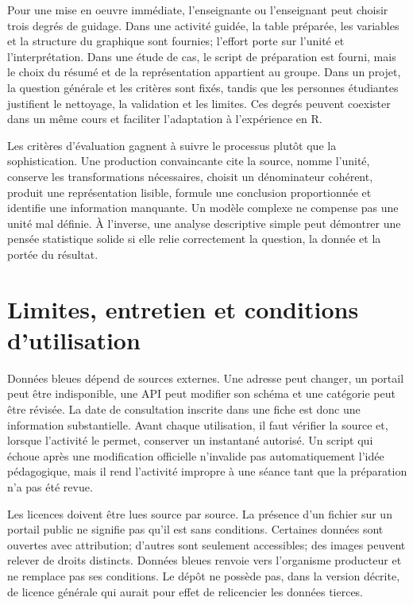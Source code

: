 Pour une mise en oeuvre immédiate, l'enseignante ou l'enseignant peut choisir trois degrés de guidage. Dans une activité guidée, la table préparée, les variables et la structure du graphique sont fournies; l'effort porte sur l'unité et l'interprétation. Dans une étude de cas, le script de préparation est fourni, mais le choix du résumé et de la représentation appartient au groupe. Dans un projet, la question générale et les critères sont fixés, tandis que les personnes étudiantes justifient le nettoyage, la validation et les limites. Ces degrés peuvent coexister dans un même cours et faciliter l'adaptation à l'expérience en R.

Les critères d'évaluation gagnent à suivre le processus plutôt que la sophistication. Une production convaincante cite la source, nomme l'unité, conserve les transformations nécessaires, choisit un dénominateur cohérent, produit une représentation lisible, formule une conclusion proportionnée et identifie une information manquante. Un modèle complexe ne compense pas une unité mal définie. À l'inverse, une analyse descriptive simple peut démontrer une pensée statistique solide si elle relie correctement la question, la donnée et la portée du résultat.

\section{Limites, entretien et conditions d'utilisation}

Données bleues dépend de sources externes. Une adresse peut changer, un portail peut être indisponible, une API peut modifier son schéma et une catégorie peut être révisée. La date de consultation inscrite dans une fiche est donc une information substantielle. Avant chaque utilisation, il faut vérifier la source et, lorsque l'activité le permet, conserver un instantané autorisé. Un script qui échoue après une modification officielle n'invalide pas automatiquement l'idée pédagogique, mais il rend l'activité impropre à une séance tant que la préparation n'a pas été revue.

Les licences doivent être lues source par source. La présence d'un fichier sur un portail public ne signifie pas qu'il est sans conditions. Certaines données sont ouvertes avec attribution; d'autres sont seulement accessibles; des images peuvent relever de droits distincts. Données bleues renvoie vers l'organisme producteur et ne remplace pas ses conditions. Le dépôt ne possède pas, dans la version décrite, de licence générale qui aurait pour effet de relicencier les données tierces.

